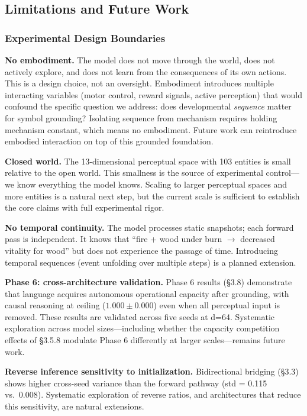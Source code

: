 \documentclass{article}
\begin{document}
\subsection{Limitations and Future Work}

\subsubsection{Experimental Design Boundaries}

\textbf{No embodiment.} The model does not move through the world, does not actively explore, and does not learn from the consequences of its own actions. This is a design choice, not an oversight. Embodiment introduces multiple interacting variables (motor control, reward signals, active perception) that would confound the specific question we address: does developmental \emph{sequence} matter for symbol grounding? Isolating sequence from mechanism requires holding mechanism constant, which means no embodiment. Future work can reintroduce embodied interaction on top of this grounded foundation.

\textbf{Closed world.} The 13-dimensional perceptual space with 103 entities is small relative to the open world. This smallness is the source of experimental control---we know everything the model knows. Scaling to larger perceptual spaces and more entities is a natural next step, but the current scale is sufficient to establish the core claims with full experimental rigor.

\textbf{No temporal continuity.} The model processes static snapshots; each forward pass is independent. It knows that ``fire + wood under burn $\rightarrow$ decreased vitality for wood'' but does not experience the passage of time. Introducing temporal sequences (event unfolding over multiple steps) is a planned extension.

\textbf{Phase 6: cross-architecture validation.} Phase 6 results (\S3.8) demonstrate that language acquires autonomous operational capacity after grounding, with causal reasoning at ceiling ($1.000 \pm 0.000$) even when all perceptual input is removed. These results are validated across five seeds at d=64. Systematic exploration across model sizes---including whether the capacity competition effects of \S3.5.8 modulate Phase 6 differently at larger scales---remains future work.

\textbf{Reverse inference sensitivity to initialization.} Bidirectional bridging (\S3.3) shows higher cross-seed variance than the forward pathway (std = 0.115 vs.\ 0.008). Systematic exploration of reverse ratios, and architectures that reduce this sensitivity, are natural extensions.
\end{document}
